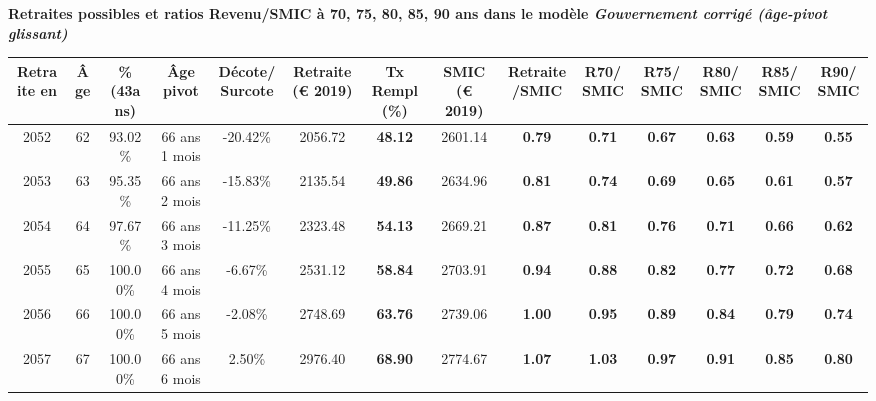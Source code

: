  \vspace{0.1cm} 
{\bf \noindent Retraites possibles et ratios Revenu/SMIC à 70, 75, 80, 85, 90 ans dans le modèle \emph{Gouvernement corrigé (âge-pivot glissant)}}  
 
\begin{adjustbox}{max width=\textwidth} 
\begin{tabular}[htb]{|c|c||c|c|c||c|c||c|c||c|c|c|c|c|} 
\hline 
 Retraite en &  Âge &  \%(43ans) &  Âge pivot &  Décote/Surcote &  Retraite (\euro{} 2019) &  Tx Rempl(\%) &  SMIC (\euro{} 2019) &  Retraite/SMIC &  R70/SMIC &  R75/SMIC &  R80/SMIC &  R85/SMIC &  R90/SMIC \\ 
\hline \hline 
 2052 &  62 &  93.02\% &  66 ans 1 mois &  -20.42\% &  2056.72 &  {\bf 48.12} &  2601.14 &  {\bf {\color{red} 0.79}} &  {\bf {\color{red} 0.71}} &  {\bf {\color{red} 0.67}} &  {\bf {\color{red} 0.63}} &  {\bf {\color{red} 0.59}} &  {\bf {\color{red} 0.55}} \\ 
\hline 
 2053 &  63 &  95.35\% &  66 ans 2 mois &  -15.83\% &  2135.54 &  {\bf 49.86} &  2634.96 &  {\bf {\color{red} 0.81}} &  {\bf {\color{red} 0.74}} &  {\bf {\color{red} 0.69}} &  {\bf {\color{red} 0.65}} &  {\bf {\color{red} 0.61}} &  {\bf {\color{red} 0.57}} \\ 
\hline 
 2054 &  64 &  97.67\% &  66 ans 3 mois &  -11.25\% &  2323.48 &  {\bf 54.13} &  2669.21 &  {\bf {\color{red} 0.87}} &  {\bf {\color{red} 0.81}} &  {\bf {\color{red} 0.76}} &  {\bf {\color{red} 0.71}} &  {\bf {\color{red} 0.66}} &  {\bf {\color{red} 0.62}} \\ 
\hline 
 2055 &  65 &  100.00\% &  66 ans 4 mois &  -6.67\% &  2531.12 &  {\bf 58.84} &  2703.91 &  {\bf {\color{red} 0.94}} &  {\bf {\color{red} 0.88}} &  {\bf {\color{red} 0.82}} &  {\bf {\color{red} 0.77}} &  {\bf {\color{red} 0.72}} &  {\bf {\color{red} 0.68}} \\ 
\hline 
 2056 &  66 &  100.00\% &  66 ans 5 mois &  -2.08\% &  2748.69 &  {\bf 63.76} &  2739.06 &  {\bf 1.00} &  {\bf {\color{red} 0.95}} &  {\bf {\color{red} 0.89}} &  {\bf {\color{red} 0.84}} &  {\bf {\color{red} 0.79}} &  {\bf {\color{red} 0.74}} \\ 
\hline 
 2057 &  67 &  100.00\% &  66 ans 6 mois &  2.50\% &  2976.40 &  {\bf 68.90} &  2774.67 &  {\bf 1.07} &  {\bf 1.03} &  {\bf {\color{red} 0.97}} &  {\bf {\color{red} 0.91}} &  {\bf {\color{red} 0.85}} &  {\bf {\color{red} 0.80}} \\ 
\hline 
\hline 
\end{tabular} 
\end{adjustbox} 
 
